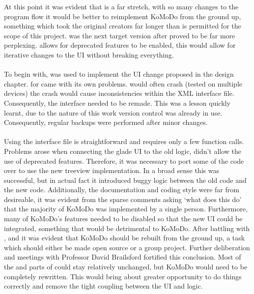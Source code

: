     At this point it was evident that  is a far stretch, with so many changes to the program flow it would be better to reimplement KoMoDo from the ground up, something which took the original creators far longer than is permitted for the scope of this project.
     was the next target version after  proved to be far more perplexing.  allows for deprecated features to be enabled, this would allow for iterative changes to the UI without breaking everything.\\\\
    To begin with,  was used to implement the UI change proposed in the design chapter.  for  came with its own problems.  would often crash (tested on multiple devices) the crash would cause inconsistencies within the XML interface file. Consequently, the interface needed to be remade. This was a lesson quickly learnt, due to the nature of this work version control was already in use. Consequently, regular backups were performed after minor changes.\\\\
    Using the  interface file is straightforward and requires only a few  function calls. Problems arose when connecting the glade UI to the old logic,  didn't allow the use of deprecated features. Therefore, it was necessary to port some of the code over to use the new treeview implementation. In a broad sense this was successful, but in actual fact it introduced buggy logic between the old  code and the new  code. Additionally, the documentation and coding style were far from desireable, it was evident from the sparse comments asking `what does this do' that the majority of KoMoDo was implemented by a single person. Furthermore, many of KoMoDo's features needed to be disabled so that the new UI could be integrated, something that would be detrimental to KoMoDo.
    After battling with ,  and  it was evident that KoMoDo should be rebuilt from the ground up, a task which should either be made open source or a group project. Further deliberation and meetings with Professor David Brailsford fortified this conclusion. Most of the  and parts of  could stay relatively unchanged, but KoMoDo would need to be completely rewritten. This would bring about greater opportunity to do things correctly and remove the tight coupling between the UI and logic.\\\\
